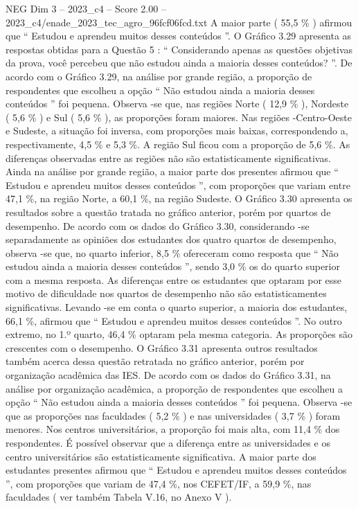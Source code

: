 \begin{textsample}{NEG Dim 3 – 2023\_c4 – Score 2.00 – 2023\_c4/enade\_2023\_tec\_agro\_96fcf06fcd.txt}
A maior parte ( 55,5 \% ) afirmou que “ Estudou e aprendeu muitos desses conteúdos ”.
O Gráfico 3.29 apresenta as respostas obtidas para a Questão 5 : “ Considerando apenas as questões objetivas da prova, você percebeu que não estudou ainda a maioria desses conteúdos? ”.
De acordo com o Gráfico 3.29, na análise por grande região, a proporção de respondentes que escolheu a opção “ Não estudou ainda a maioria desses conteúdos ” foi pequena.
Observa -se que, nas regiões Norte ( 12,9 \% ), Nordeste ( 5,6 \% ) e Sul ( 5,6 \% ), as proporções foram maiores.
Nas regiões -Centro-Oeste e Sudeste, a situação foi inversa, com proporções mais baixas, correspondendo a, respectivamente, 4,5 \% e 5,3 \%.
A região Sul ficou com a proporção de 5,6 \%.
As diferenças observadas entre as regiões não são estatisticamente significativas.
Ainda na análise por grande região, a maior parte dos presentes afirmou que “ Estudou e aprendeu muitos desses conteúdos ”, com proporções que variam entre 47,1 \%, na região Norte, a 60,1 \%, na região Sudeste.
O Gráfico 3.30 apresenta os resultados sobre a questão tratada no gráfico anterior, porém por quartos de desempenho.
De acordo com os dados do Gráfico 3.30, considerando -se separadamente as opiniões dos estudantes dos quatro quartos de desempenho, observa -se que, no quarto inferior, 8,5 \% ofereceram como resposta que “ Não estudou ainda a maioria desses conteúdos ”, sendo 3,0 \% os do quarto superior com a mesma resposta.
As diferenças entre os estudantes que optaram por esse motivo de dificuldade nos quartos de desempenho não são estatisticamentes significativas.
Levando -se em conta o quarto superior, a maioria dos estudantes, 66,1 \%, afirmou que “ Estudou e aprendeu muitos desses conteúdos ”.
No outro extremo, no 1.º quarto, 46,4 \% optaram pela mesma categoria.
As proporções são crescentes com o desempenho.
O Gráfico 3.31 apresenta outros resultados também acerca dessa questão retratada no gráfico anterior, porém por organização acadêmica das IES.
De acordo com os dados do Gráfico 3.31, na análise por organização acadêmica, a proporção de respondentes que escolheu a opção “ Não estudou ainda a maioria desses conteúdos ” foi pequena.
Observa -se que as proporções nas faculdades ( 5,2 \% ) e nas universidades ( 3,7 \% ) foram menores.
Nos centros universitários, a proporção foi mais alta, com 11,4 \% dos respondentes.
É possível observar que a diferença entre as universidades e os centro universitários são estatisticamente significativa.
A maior parte dos estudantes presentes afirmou que “ Estudou e aprendeu muitos desses conteúdos ”, com proporções que variam de 47,4 \%, nos CEFET/IF, a 59,9 \%, nas faculdades ( ver também Tabela V.16, no Anexo V ).

\end{textsample}
